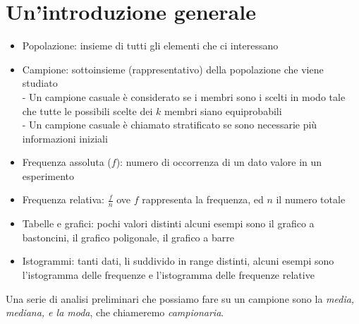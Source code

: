 %
%
%
%




\section{Un'introduzione generale}
\begin{itemize}
\item Popolazione: insieme di tutti gli elementi che ci interessano
\item Campione: sottoinsieme (rappresentativo) della popolazione che viene studiato\\
		- Un campione casuale è considerato se i membri sono i scelti in modo tale che tutte le possibili scelte dei $k$ membri siano equiprobabili\\
		- Un campione casuale è chiamato stratificato se sono necessarie più informazioni iniziali
\item Frequenza assoluta ($f$): numero di occorrenza di un dato valore in un esperimento
\item Frequenza relativa: $\frac{f}{n}$ ove $f$ rappresenta la frequenza, ed $n$ il numero totale
\item Tabelle e grafici: pochi valori distinti alcuni esempi sono il grafico a bastoncini, il grafico poligonale, il grafico a barre
\item Istogrammi: tanti dati, li suddivido in range distinti, alcuni esempi sono l'istogramma delle frequenze e l'istogramma delle frequenze relative
\end{itemize}
Una serie di analisi preliminari che possiamo fare su un campione sono la \emph{media, mediana, e la moda}, che chiameremo \emph{campionaria}. 

